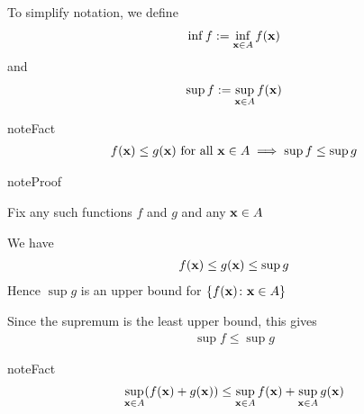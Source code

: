 \documentclass[letterpaper,10pt,english]{jupyterBook}
\begin{document}
\sphinxAtStartPar
To simplify notation, we define
\begin{equation*}
\begin{split}
%
\inf f 
:= \inf_{{\bf x} \in A} f({\bf x}) 
%
\end{split}
\end{equation*}
\sphinxAtStartPar
and
\begin{equation*}
\begin{split}
%
\sup f 
:= \sup_{{\bf x} \in A} f({\bf x}) 
%
\end{split}
\end{equation*}
\begin{sphinxadmonition}{note}{Fact}
\begin{equation*}
\begin{split}
%
f({\bf x}) \leq g({\bf x}) \text{ for all } {\bf x} \in A
\implies
\sup f \leq \sup g
%
\end{split}
\end{equation*}\end{sphinxadmonition}

\begin{sphinxadmonition}{note}{Proof}

\sphinxAtStartPar
Fix any such functions \(f\) and \(g\) and any \({\bf x} \in A\)

\sphinxAtStartPar
We have
\begin{equation*}
\begin{split}
%
f({\bf x}) \leq g({\bf x}) \leq \sup g
%
\end{split}
\end{equation*}
\sphinxAtStartPar
Hence \(\sup g\) is an upper bound for \(\{ f({\bf x}) \colon {\bf x } \in A\}\)

\sphinxAtStartPar
Since the supremum is the least upper bound, this gives
\begin{equation*}
\begin{split}
%
\sup f \leq \sup g
%
\end{split}
\end{equation*}\end{sphinxadmonition}

\begin{sphinxadmonition}{note}{Fact}
\begin{equation*}
\begin{split}
%
\sup_{{\bf x} \in A} (f({\bf x}) + g({\bf x})) 
\leq \sup_{{\bf x} \in A} f({\bf x}) + \sup_{{\bf x} \in A} g({\bf x})
%
\end{split}
\end{equation*}\end{sphinxadmonition}
\end{document}

